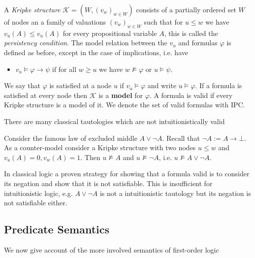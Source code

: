 \documentclass[a4paper,UKenglish,cleveref, autoref, thm-restate]{lipics-v2021}
\begin{document}
\begin{definition}
	A \emph{Kripke structure} $\mathcal K = (W, (v_w)_{w\in W})$ consists of a partially ordered set $W$ of nodes an a family of valuations $(v_w)_{w\in W}$ such that for $u\leq w$ we have $v_u(A)\leq v_u(A)$ for every propositional variable $A$, this is called the \emph{persistency condition}. The model relation between the $v_u$ and formulas $\varphi$ is defined as before, except in the case of implications, i.e. have
	\begin{itemize}
		\item $v_u\models\varphi\to \psi$ if for all $w\geq u$ we have $w\not\models\varphi$ or $u\models\psi$.
	\end{itemize}
	We say that $\varphi$ is satisfied at a node $u$ if $v_u\models\varphi$ and write $u\models\varphi$. If a formula is satisfied at every node then $\mathcal K$ is a \textbf{model} for $\varphi$. A formula is valid if every Kripke structure is a model of it. We denote the set of valid formulas with IPC.
\end{definition}
There are many classical tautologies which are not intuitionistically valid
\begin{example}\label{LEMcounterexample}
	Consider the famous law of excluded middle $A\vee\neg A$. Recall that $\neg A := A\to \bot$. As a counter-model consider a Kripke structure with two nodes $u\leq w$ and $v_u(A) = 0, v_w(A) = 1$. Then $u\not\models A$ and $u\not\models \neg A$, i.e. $u\not\models A\vee\neg A$. 
\end{example}
In classical logic a proven strategy for showing that a formula valid is to consider its negation and show that it is not satisfiable. This is insufficient for intuitionistic logic, e.g. $A\vee\neg A$ is not a intuitionistic tautology but its negation is not satisfiable either.



\subsection{Predicate Semantics}

We now give account of the more involved semantics of first-order logic
\end{document}
